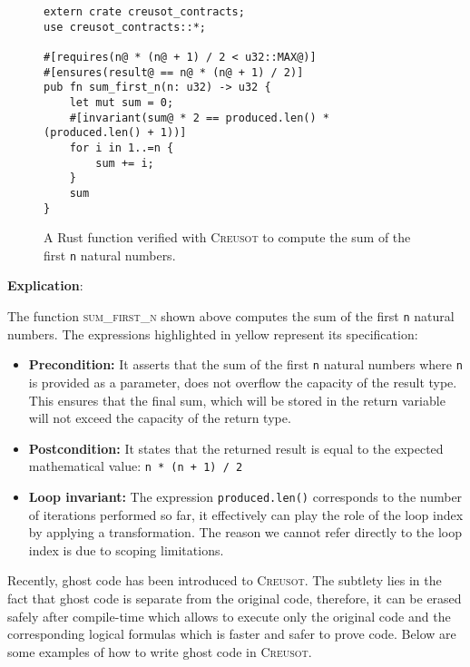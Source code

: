 \documentclass[12pt,a4paper]{report}
\begin{document}
\begin{figure}[h]
  \centering
  \begin{minipage}{0.9\linewidth}
    \begin{verbatim}
extern crate creusot_contracts;
use creusot_contracts::*;

#[requires(n@ * (n@ + 1) / 2 < u32::MAX@)]
#[ensures(result@ == n@ * (n@ + 1) / 2)]
pub fn sum_first_n(n: u32) -> u32 {
    let mut sum = 0;
    #[invariant(sum@ * 2 == produced.len() * (produced.len() + 1))]
    for i in 1..=n {
        sum += i;
    }
    sum
}
    \end{verbatim}
   \caption{A Rust function verified with \textsc{Creusot} to compute the sum of the first \texttt{n} natural numbers.}
    \label{fig:sum-first-n}
  \end{minipage}
\end{figure}

\textbf{Explication}: 

The function \textsc{sum\_first\_n} shown above computes the sum of the first \texttt{n} natural numbers. The expressions highlighted in yellow represent its specification:
\begin{itemize}
  \item \textbf{Precondition:} It asserts that the sum of the first \texttt{n} natural numbers where \texttt{n} is provided as a parameter,  does not overflow the capacity of the result type. This ensures that the final sum, which will be stored in the return variable will not exceed the capacity of the return type.
  
  \item \textbf{Postcondition:} It states that the returned result is equal to the expected mathematical value: \texttt{n * (n + 1) / 2}
  
    \item \textbf{Loop invariant:} The expression \texttt{produced.len()} corresponds to the number of iterations performed so far, it effectively can play the role of the loop index by applying a transformation. The reason we cannot refer directly to the loop index is due to scoping limitations.
\end{itemize}


Recently, ghost code has been introduced to \textsc{Creusot}. The subtlety lies in the fact that ghost code is separate from the original code, therefore, it can be erased safely after compile-time which allows to execute only the original code and the corresponding logical formulas which is faster and safer to prove code. Below are some examples of how to write ghost code in \textsc{Creusot}.
\end{document}
